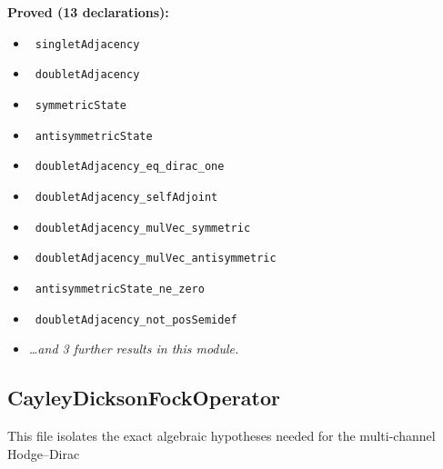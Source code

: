 \documentclass{report}
\theoremstyle{definition}
\begin{document}
\noindent\textbf{Proved (13 declarations):}
\begin{itemize}
  \item {}\leanok\ \texttt{singletAdjacency}
  \item {}\leanok\ \texttt{doubletAdjacency}
  \item {}\leanok\ \texttt{symmetricState}
  \item {}\leanok\ \texttt{antisymmetricState}
  \item {}\leanok\ \texttt{doubletAdjacency\_eq\_dirac\_one}
  \item {}\leanok\ \texttt{doubletAdjacency\_selfAdjoint}
  \item {}\leanok\ \texttt{doubletAdjacency\_mulVec\_symmetric}
  \item {}\leanok\ \texttt{doubletAdjacency\_mulVec\_antisymmetric}
  \item {}\leanok\ \texttt{antisymmetricState\_ne\_zero}
  \item {}\leanok\ \texttt{doubletAdjacency\_not\_posSemidef}
  \item \emph{\ldots and 3 further results in this module.}
\end{itemize}

\subsection{CayleyDicksonFockOperator}
This file isolates the exact algebraic hypotheses needed for the multi-channel Hodge--Dirac
\end{document}
